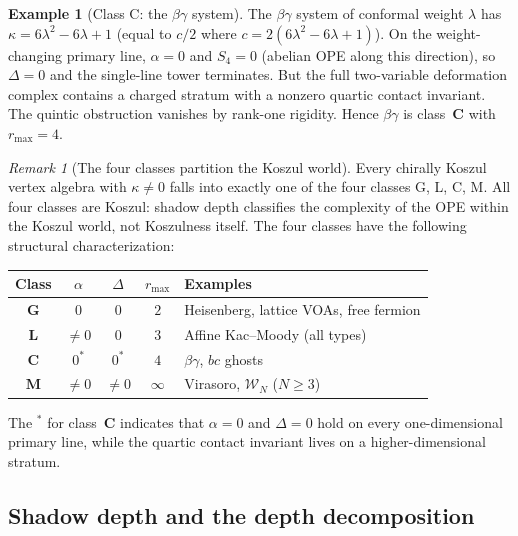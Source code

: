 \documentclass[11pt]{article}
\theoremstyle{plain}
\theoremstyle{definition}
\newtheorem{example}[theorem]{Example}
\theoremstyle{remark}
\newtheorem{remark}[theorem]{Remark}
\newcommand{\cW}{\mathcal{W}}
\begin{document}
\begin{example}[Class C: the $\beta\gamma$ system]
\label{ex:betagamma-classC}
The $\beta\gamma$ system of conformal weight $\lambda$ has
$\kappa = 6\lambda^2 - 6\lambda + 1$ (equal to $c/2$ where
$c = 2(6\lambda^2 - 6\lambda + 1)$). On the weight-changing
primary line, $\alpha = 0$ and $S_4 = 0$ (abelian OPE along
this direction), so $\Delta = 0$ and the single-line tower
terminates. But the full two-variable deformation complex
contains a charged stratum with a nonzero quartic contact
invariant. The quintic obstruction vanishes by rank-one
rigidity. Hence $\beta\gamma$ is class~$\mathbf{C}$
with $r_{\max} = 4$.
\end{example}

\begin{remark}[The four classes partition the Koszul world]
\label{rem:four-classes-partition}
Every chirally Koszul vertex algebra with $\kappa \neq 0$
falls into exactly one of the four classes G, L, C, M.
All four classes are Koszul: shadow depth classifies the
complexity of the OPE within the Koszul world, not
Koszulness itself.
The four classes have the following structural
characterization:
\begin{center}
\renewcommand{\arraystretch}{1.3}
\begin{tabular}{ccccl}
\toprule
Class & $\alpha$ & $\Delta$ & $r_{\max}$ & Examples \\
\midrule
$\mathbf{G}$ & $0$ & $0$ & $2$ & Heisenberg, lattice VOAs, free fermion \\
$\mathbf{L}$ & $\neq 0$ & $0$ & $3$ & Affine Kac--Moody (all types) \\
$\mathbf{C}$ & $0^*$ & $0^*$ & $4$ & $\beta\gamma$, $bc$ ghosts \\
$\mathbf{M}$ & $\neq 0$ & $\neq 0$ & $\infty$ & Virasoro, $\cW_N$ ($N \geq 3$) \\
\bottomrule
\end{tabular}
\end{center}
\noindent The ${}^*$ for class~$\mathbf{C}$ indicates that
$\alpha = 0$ and $\Delta = 0$ hold on every one-dimensional
primary line, while the quartic contact invariant lives on a
higher-dimensional stratum.
\end{remark}


\subsection{Shadow depth and the depth decomposition}
\label{subsec:depth-decomposition}
\end{document}

